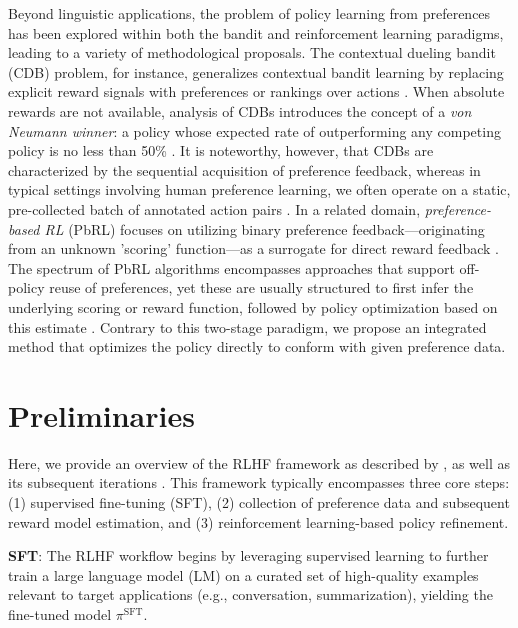 Beyond linguistic applications, the problem of policy learning from preferences has been explored within both the bandit and reinforcement learning paradigms, leading to a variety of methodological proposals. The contextual dueling bandit (CDB) problem, for instance, generalizes contextual bandit learning by replacing explicit reward signals with preferences or rankings over actions \citep{yue2012karmed,dudik2015contextual}. When absolute rewards are not available, analysis of CDBs introduces the concept of a \textit{von Neumann winner}: a policy whose expected rate of outperforming any competing policy is no less than 50\% \citep{dudik2015contextual}. It is noteworthy, however, that CDBs are characterized by the sequential acquisition of preference feedback, whereas in typical settings involving human preference learning, we often operate on a static, pre-collected batch of annotated action pairs \citep{yan2022human}. In a related domain, \textit{preference-based RL} (PbRL) focuses on utilizing binary preference feedback—originating from an unknown 'scoring' function—as a surrogate for direct reward feedback \citep{BusaFekete2014,ruiz2023dueling}. The spectrum of PbRL algorithms encompasses approaches that support off-policy reuse of preferences, yet these are usually structured to first infer the underlying scoring or reward function, followed by policy optimization based on this estimate \citep{jain2013learning,BusaFekete2014,christiano2017deep,sadigh2017active,kupcsik2018learning}. Contrary to this two-stage paradigm, we propose an integrated method that optimizes the policy directly to conform with given preference data.

\section{Preliminaries}\label{section:prelims}

Here, we provide an overview of the RLHF framework as described by \citeauthor{ziegler2020finetuning}, as well as its subsequent iterations \citep{stiennon2022learning, bai2022training, ouyang2022training}. This framework typically encompasses three core steps: (1) supervised fine-tuning (SFT), (2) collection of preference data and subsequent reward model estimation, and (3) reinforcement learning-based policy refinement.

\textbf{SFT}: The RLHF workflow begins by leveraging supervised learning to further train a large language model (LM) on a curated set of high-quality examples relevant to target applications (e.g., conversation, summarization), yielding the fine-tuned model $\pi^\text{SFT}$.

